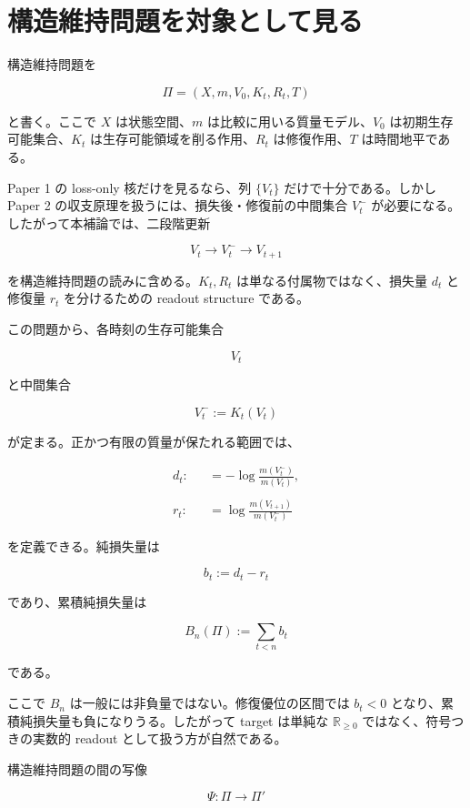 \documentclass[12pt,a4paper]{article}
\begin{document}
\section{構造維持問題を対象として見る}\label{ux69cbux9020ux7dadux6301ux554fux984cux3092ux5bfeux8c61ux3068ux3057ux3066ux898bux308b}

構造維持問題を

\[
\Pi = (X,m,V_0,K_{t},R_{t},T)
\]

と書く。ここで \(X\) は状態空間、\(m\) は比較に用いる質量モデル、\(V_0\) は初期生存可能集合、\(K_{t}\) は生存可能領域を削る作用、\(R_{t}\) は修復作用、\(T\) は時間地平である。

Paper 1 の loss-only 核だけを見るなら、列 \(\{V_{t}\}\) だけで十分である。しかし Paper 2 の収支原理を扱うには、損失後・修復前の中間集合 \(V_{t}^-\) が必要になる。したがって本補論では、二段階更新

\[
V_{t} \longrightarrow V_{t}^- \longrightarrow V_{t+1}
\]

を構造維持問題の読みに含める。\(K_{t},R_{t}\) は単なる付属物ではなく、損失量 \(d_{t}\) と修復量 \(r_{t}\) を分けるための readout structure である。

この問題から、各時刻の生存可能集合

\[
V_{t}
\]

と中間集合

\[
V_{t}^- := K_{t}(V_{t})
\]

が定まる。正かつ有限の質量が保たれる範囲では、

\[
\begin{aligned}
d_{t} :&= -\log \frac{m(V_{t}^-)}{m(V_{t})}, \\
\qquad \\
r_{t} :&= \log \frac{m(V_{t+1})}{m(V_{t}^-)}
\end{aligned}
\]

を定義できる。純損失量は

\[
b_{t} := d_{t}-r_{t}
\]

であり、累積純損失量は

\[
B_{n}(\Pi) := \sum_{t<n} b_{t}
\]

である。

ここで \(B_{n}\) は一般には非負量ではない。修復優位の区間では \(b_{t}<0\) となり、累積純損失量も負になりうる。したがって target は単純な \(\mathbb{R}_{\ge0}\) ではなく、符号つきの実数的 readout として扱う方が自然である。

構造維持問題の間の写像

\[
\Psi:\Pi\to\Pi'
\]
\end{document}
